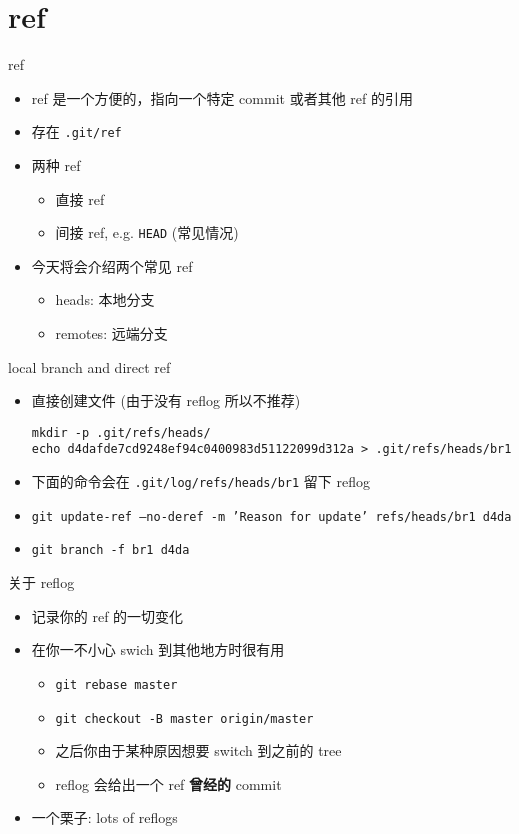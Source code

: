 \documentclass[aspectratio=169]{beamer}
\newcommand{\T}[1]{\texttt{#1}}
\begin{document}
\section{ref}
\begin{frame}{ref}
  \begin{itemize}
    \item ref 是一个方便的，指向一个特定 commit 或者其他 ref 的引用
    \item 存在 \T{.git/ref}
    \item 两种 ref\begin{itemize}
      \item 直接 ref
	  \item 间接 ref, e.g. \T{HEAD} (常见情况)
    \end{itemize}
    \item 今天将会介绍两个常见 ref\begin{itemize}
      \item heads: 本地分支
      \item remotes: 远端分支
    \end{itemize}
  \end{itemize}
\end{frame}

\begin{frame}[fragile]{local branch and direct ref}
  \begin{itemize}
    \item<1-> 直接创建文件 (由于没有 reflog 所以不推荐)\begin{verbatim}
mkdir -p .git/refs/heads/
echo d4dafde7cd9248ef94c0400983d51122099d312a > .git/refs/heads/br1
\end{verbatim}
    \item<2-> 下面的命令会在 \T{.git/log/refs/heads/br1} 留下 reflog
    \item<2-> \T{git update-ref --no-deref -m 'Reason for update' refs/heads/br1 d4da}
    \item<2-> \T{git branch -f br1 d4da}
  \end{itemize}
\end{frame}

\begin{frame}{关于 reflog}
  \begin{itemize}
    \item 记录你的 ref 的一切变化
    \item 在你一不小心 swich 到其他地方时很有用\begin{itemize}
      \item \T{git rebase master}
      \item \T{git checkout -B master origin/master}
      \item 之后你由于某种原因想要 switch 到之前的 tree
      \item reflog 会给出一个 ref \textbf{曾经的} commit
    \end{itemize}
    \item 一个栗子: lots of reflogs
  \end{itemize}
\end{frame}
\end{document}
